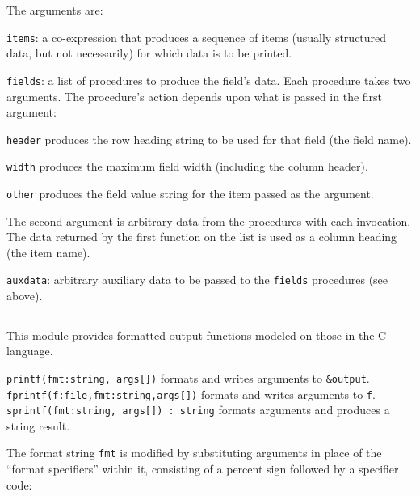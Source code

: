

The arguments are:

\texttt{items}: a co-expression that produces a sequence of items
(usually structured data, but not necessarily) for which data
is to be printed.

\texttt{fields}: a list of procedures to produce the
field's data. Each procedure takes two arguments. The
procedure's action depends upon what is passed in the
first argument:

\texttt{header} produces the row heading string to be used for that
field (the field name).

\texttt{width} produces the maximum field width (including the column
header).

\texttt{other} produces the field value string for the item passed as
the argument.

The second argument is arbitrary data from the procedures with each
invocation. The data returned by the first function on the list is used
as a column heading (the item name).

\texttt{auxdata}: arbitrary auxiliary data to be passed to the \texttt{fields}
procedures (see above).

\vspace{0.25cm}\hrule{}

This module provides formatted output functions
modeled on those in the C language.

\texttt{printf(fmt:string, args[])} formats and writes arguments to
\texttt{\&output}.\\
\texttt{fprintf(f:file,fmt:string,args[])} formats and writes arguments
to \texttt{f}.\\
\texttt{sprintf(fmt:string, args[]) : string} formats arguments and
produces a string result.

The format string \texttt{fmt} is modified by substituting arguments
in place of the ``format specifiers'' within it, consisting of a
percent sign followed by a specifier code:

